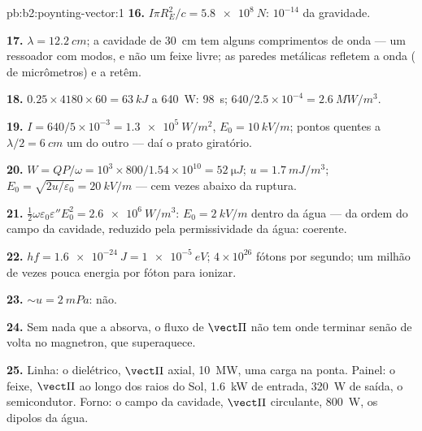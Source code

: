 \begin{solution}{pb:b2:poynting-vector:1}
\textbf{16.} $I\pi R_E^2/c = \qty{5.8e8}{N}$: $10^{-14}$ da gravidade.

\textbf{17.} $\lambda = \qty{12.2}{cm}$; a cavidade de \qty{30}{cm} tem alguns comprimentos de onda
--- um ressoador com modos, e não um feixe livre; as paredes metálicas refletem a
onda ( de micrômetros) e a retêm.

\textbf{18.} $0.25 \times 4180 \times 60 = \qty{63}{kJ}$ a \qty{640}{W}: \qty{98}{s};
$640/2.5 \times 10^{-4} = \qty{2.6}{MW/m^3}$.

\textbf{19.} $I = 640/5 \times 10^{-3} = \qty{1.3e5}{W/m^2}$, $E_0 = \qty{10}{kV/m}$; pontos quentes
a $\lambda/2 = \qty{6}{cm}$ um do outro --- daí o prato giratório.

\textbf{20.} $W = QP/\omega = 10^3 \times 800/1.54 \times 10^{10} = \qty{52}{\micro J}$; $u =
\qty{1.7}{mJ/m^3}$; $E_0 = \sqrt{2u/\varepsilon_0} = \qty{20}{kV/m}$ --- cem vezes abaixo
da ruptura.

\textbf{21.} $\tfrac12\omega\varepsilon_0\varepsilon''E_0^2 = \qty{2.6e6}{W/m^3}$: $E_0 = \qty{2}{kV/m}$
dentro da água --- da ordem do campo da cavidade, reduzido pela
permissividade da água: coerente.

\textbf{22.} $hf = \qty{1.6e-24}{J} = \qty{1e-5}{eV}$; $4 \times 10^{26}$ fótons por segundo;
um milhão de vezes pouca energia por fóton para ionizar.

\textbf{23.} $\sim u = \qty{2}{mPa}$: não.

\textbf{24.} Sem nada que a absorva, o fluxo de $\vect\Pi$ não tem
onde terminar senão de volta no magnetron, que superaquece.

\textbf{25.} Linha: o dielétrico, $\vect\Pi$ axial, \qty{10}{MW}, uma carga na
ponta. Painel: o feixe, $\vect\Pi$ ao longo dos raios do Sol, \qty{1.6}{kW}
de entrada, \qty{320}{W} de saída, o semicondutor. Forno: o campo da cavidade, $\vect\Pi$
circulante, \qty{800}{W}, os dipolos da água.
\end{solution}
